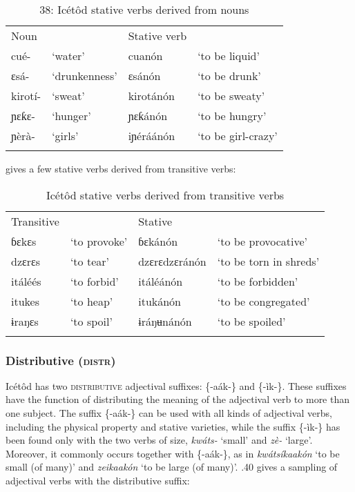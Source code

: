 \begin{table}
\caption{38: Icétôd stative verbs derived from nouns}
\label{tab:8}


\begin{tabularx}{\textwidth}{XXXX}
\lsptoprule

Noun &  & Stative verb & \\
cué- & ‘water’ & cuanón & ‘to be liquid’\\
ɛsá- & ‘drunkenness’ & ɛsánón & ‘to be drunk’\\
kirotí- & ‘sweat’ & kirotánón & ‘to be sweaty’\\
ɲɛƙɛ{}- & ‘hunger’ & ɲɛƙánón & ‘to be hungry’\\
ɲèrà- & ‘girls’ & iɲéráánón & ‘to be girl-crazy’\\
\lspbottomrule
\end{tabularx}
\end{table}

 gives a few stative verbs derived from transitive verbs:
 


\begin{table}
\caption{Icétôd stative verbs derived from transitive verbs}
\label{tab:8.39}


\begin{tabularx}{\textwidth}{XXXX}
\lsptoprule

Transitive &  & Stative & \\
ɓɛkɛs & ‘to provoke’ & ɓɛkánón & ‘to be provocative’\\
dzɛrɛs & ‘to tear’ & dzɛrɛdzɛránón & ‘to be torn in shreds’\\
itáléés & ‘to forbid’ & itáléánón & ‘to be forbidden’\\
itukes & ‘to heap’ & itukánón & ‘to be congregated’\\
ɨraŋɛs & ‘to spoil’ & ɨráŋʉnánón & ‘to be spoiled’\\
\lspbottomrule
\end{tabularx}
\end{table}

\subsubsection{Distributive (\textsc{distr})}

Icétôd has two \textsc{distributive} adjectival suffixes: \{-aák-\} and \{-ìk-\}. These suffixes have the function of distributing the meaning of the adjectival verb to more than one subject. The suffix \{-aák-\} can be used with all kinds of adjectival verbs, including the physical property and stative varieties, while the suffix \{-ìk-\} has been found only with the two verbs of size, \textit{kwáts-} ‘small’ and \textit{zè-} ‘large’. Moreover, it commonly occurs together with \{-aák-\}, as in \textit{kwátsíkaakón} ‘to be small (of many)’ and \textit{zeikaakón} ‘to be large (of many)’. .40 gives a sampling of adjectival verbs with the distributive suffix:


